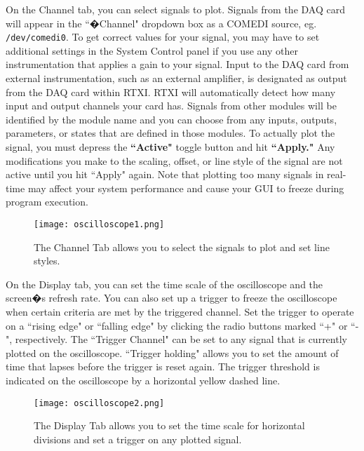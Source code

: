 On the Channel tab, you can select signals to plot. Signals from the DAQ card will appear in the ``�Channel" dropdown box as a COMEDI source, eg. \texttt{/dev/comedi0}. To get correct values for your signal, you may have to set additional settings in the System Control panel if you use any other instrumentation that applies a gain to your signal. Input to the DAQ card from external instrumentation, such as an external amplifier, is designated as output from the DAQ card within RTXI. RTXI will automatically detect how many input and output channels your card has. Signals from other modules will be identified by the module name and you can choose from any inputs, outputs, parameters, or states that are defined in those modules. \attention To actually plot the signal, you must depress the \textbf{``Active"} toggle button and hit \textbf{``Apply."} Any modifications you make to the scaling, offset, or line style of the signal are not active until you hit ``Apply" again. Note that plotting too many signals in real-time may affect your system performance and cause your GUI to freeze during program execution.

\begin{figure}[h]
\begin{center}
\texttt{[image: oscilloscope1.png]} 
\caption[Oscilloscope: Channel Tab]{The Channel Tab allows you to select the signals to plot and set line styles.} 
\end{center}
\label{fig:oscilloscope1}
\end{figure}

\newpage
{}On the Display tab, you can set the time scale of the oscilloscope and the screen�s refresh rate. You can also set up a trigger to freeze the oscilloscope when certain criteria are met by the triggered channel. Set the trigger to operate on a ``rising edge" or ``falling edge" by clicking the radio buttons marked ``+" or ``-", respectively. The ``Trigger Channel" can be set to any signal that is currently plotted on the oscilloscope. ``Trigger holding" allows you to set the amount of time that lapses before the trigger is reset again. The trigger threshold is indicated on the oscilloscope by a horizontal yellow dashed line.

\begin{figure}[h!]
\begin{center}
\texttt{[image: oscilloscope2.png]} 
\caption[Oscilloscope: Display Tab]{The Display Tab allows you to set the time scale for horizontal divisions and set a trigger on any plotted signal.} 
\end{center}
\label{fig:oscilloscope2}
\end{figure}

